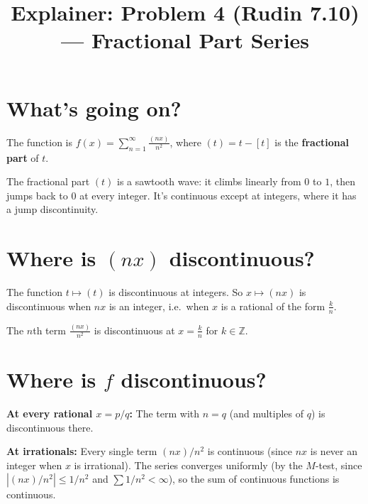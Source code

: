 \documentclass[12pt]{article}
\title{Explainer: Problem 4 (Rudin 7.10) --- Fractional Part Series}
\author{}
\date{}
\begin{document}
\maketitle

\section*{What's going on?}
The function is $f(x) = \sum_{n=1}^{\infty} \frac{(nx)}{n^2}$, where $(t) = t - [t]$ is the \textbf{fractional part} of $t$.

\begin{center}
\end{center}

The fractional part $(t)$ is a sawtooth wave: it climbs linearly from $0$ to $1$, then jumps back to $0$ at every integer. It's continuous except at integers, where it has a jump discontinuity.

\section*{Where is $(nx)$ discontinuous?}

The function $t \mapsto (t)$ is discontinuous at integers. So $x \mapsto (nx)$ is discontinuous when $nx$ is an integer, i.e.\ when $x$ is a rational of the form $\frac{k}{n}$.

The $n$th term $\frac{(nx)}{n^2}$ is discontinuous at $x = \frac{k}{n}$ for $k \in \mathbb{Z}$.

\section*{Where is $f$ discontinuous?}

\textbf{At every rational $x = p/q$:} The term with $n = q$ (and multiples of $q$) is discontinuous there.

\textbf{At irrationals:} Every single term $(nx)/n^2$ is continuous (since $nx$ is never an integer when $x$ is irrational). The series converges uniformly (by the $M$-test, since $|(nx)/n^2| \leq 1/n^2$ and $\sum 1/n^2 < \infty$), so the sum of continuous functions is continuous.
\end{document}
